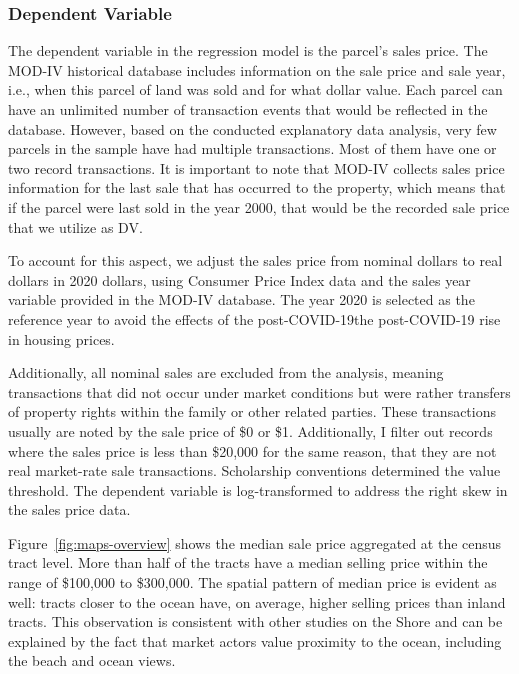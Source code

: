 \documentclass[11pt]{article}
\begin{document}
        \subsubsection{Dependent Variable}

        The dependent variable in the regression model is the parcel's sales price. The MOD-IV historical database includes information on the sale price and sale year, i.e., when this parcel of land was sold and for what dollar value. Each parcel can have an unlimited number of transaction events that would be reflected in the database. However, based on the conducted explanatory data analysis, very few parcels in the sample have had multiple transactions. Most of them have one or two record transactions. It is important to note that MOD-IV collects sales price information for the last sale that has occurred to the property, which means that if the parcel were last sold in the year 2000, that would be the recorded sale price that we utilize as DV. 

        To account for this aspect, we adjust the sales price from nominal dollars to real dollars in 2020 dollars, using Consumer Price Index data and the sales year variable provided in the MOD-IV database. The year 2020 is selected as the reference year to avoid the effects of the post-COVID-19the post-COVID-19 rise in housing prices. 
                
        Additionally, all nominal sales are excluded from the analysis, meaning transactions that did not occur under market conditions but were rather transfers of property rights within the family or other related parties. These transactions usually are noted by the sale price of \$0 or \$1. Additionally, I filter out records where the sales price is less than \$20,000 for the same reason, that they are not real market-rate sale transactions. Scholarship conventions determined the value threshold. The dependent variable is log-transformed to address the right skew in the sales price data. 

        Figure~\ref{fig:maps-overview} shows the median sale price aggregated at the census tract level. More than half of the tracts have a median selling price within the range of \$100,000 to \$300,000. The spatial pattern of median price is evident as well: tracts closer to the ocean have, on average, higher selling prices than inland tracts. This observation is consistent with other studies on the Shore and can be explained by the fact that market actors value proximity to the ocean, including the beach and ocean views. 
\end{document}
